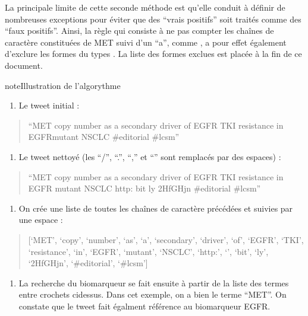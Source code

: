 \documentclass[letterpaper,10pt,english]{jupyterBook}
\begin{document}
\sphinxAtStartPar
La principale limite de cette seconde méthode est qu’elle conduit à définir de nombreuses exceptions pour éviter que des “vrais positifs” soit traités comme des “faux positifs”. Ainsi, la règle qui consiste à ne pas compter les chaînes de caractère constituées de MET suivi d’un “a”, comme , a pour effet également d’exclure les formes du types . La liste des formes exclues est placée à la fin de ce document.

\begin{sphinxadmonition}{note}{Illustration de l’algorythme}
\begin{enumerate}
%
\item {} 
\sphinxAtStartPar
Le tweet initial :

\end{enumerate}
\begin{quote}

\sphinxAtStartPar
“MET copy number as a secondary driver of EGFR TKI resistance in EGFR\sphinxhyphen{}mutant NSCLC  \#editorial \#lcsm”
\end{quote}
\begin{enumerate}
%
\item {} 
\sphinxAtStartPar
Le tweet nettoyé (les “/”, “.”, “,” et “\sphinxhyphen{}” sont remplacés par des espaces) :

\end{enumerate}
\begin{quote}

\sphinxAtStartPar
“MET copy number as a secondary driver of EGFR TKI resistance in EGFR mutant NSCLC http:  bit ly 2HfGHjn \#editorial \#lcsm”
\end{quote}
\begin{enumerate}
%
\item {} 
\sphinxAtStartPar
On crée une liste de toutes les chaînes de caractère précédées et suivies par une espace :

\end{enumerate}
\begin{quote}

\sphinxAtStartPar
{[}‘MET’, ‘copy’, ‘number’, ‘as’, ‘a’, ‘secondary’, ‘driver’, ‘of’, ‘EGFR’, ‘TKI’, ‘resistance’, ‘in’, ‘EGFR’, ‘mutant’, ‘NSCLC’, ‘http:’, ‘’, ‘bit’, ‘ly’, ‘2HfGHjn’, ‘\#editorial’, ‘\#lcsm’{]}
\end{quote}
\begin{enumerate}
%
\item {} 
\sphinxAtStartPar
La recherche du biomarqueur se fait ensuite à partir de la liste des termes entre crochets ci\sphinxhyphen{}dessus. Dans cet exemple, on a bien le terme “MET”. On constate que le tweet fait égalment référence au biomarqueur EGFR.

\end{enumerate}
\end{sphinxadmonition}
\end{document}
